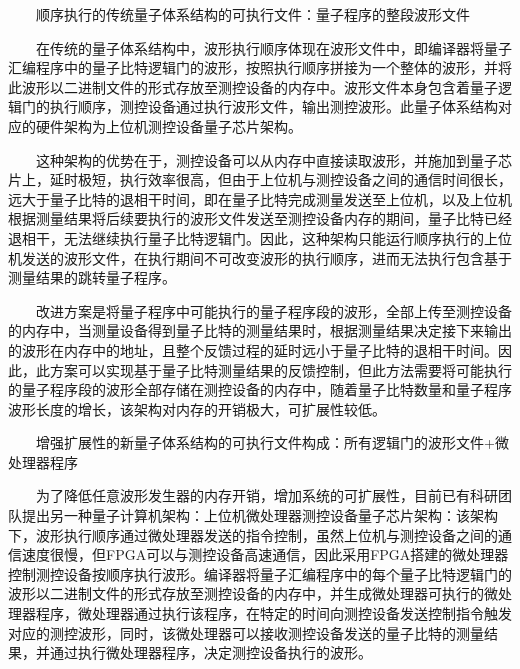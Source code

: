 \documentclass[a4paper,11pt,english]{sphinxmanual}
\begin{document}
\sphinxAtStartPar
{}

\sphinxAtStartPar
  顺序执行的传统量子体系结构的可执行文件：量子程序的整段波形文件

\sphinxAtStartPar
  在传统的量子体系结构中，波形执行顺序体现在波形文件中，即编译器将量子汇编程序中的量子比特逻辑门的波形，按照执行顺序拼接为一个整体的波形，并将此波形以二进制文件的形式存放至测控设备的内存中。波形文件本身包含着量子逻辑门的执行顺序，测控设备通过执行波形文件，输出测控波形。此量子体系结构对应的硬件架构为上位机\sphinxhyphen{}测控设备\sphinxhyphen{}量子芯片架构。

\sphinxAtStartPar
{}

\sphinxAtStartPar
  这种架构的优势在于，测控设备可以从内存中直接读取波形，并施加到量子芯片上，延时极短，执行效率很高，但由于上位机与测控设备之间的通信时间很长，远大于量子比特的退相干时间，即在量子比特完成测量发送至上位机，以及上位机根据测量结果将后续要执行的波形文件发送至测控设备内存的期间，量子比特已经退相干，无法继续执行量子比特逻辑门。因此，这种架构只能运行顺序执行的上位机发送的波形文件，在执行期间不可改变波形的执行顺序，进而无法执行包含基于测量结果的跳转量子程序。

\sphinxAtStartPar
{}

\sphinxAtStartPar
  改进方案是将量子程序中可能执行的量子程序段的波形，全部上传至测控设备的内存中，当测量设备得到量子比特的测量结果时，根据测量结果决定接下来输出的波形在内存中的地址，且整个反馈过程的延时远小于量子比特的退相干时间。因此，此方案可以实现基于量子比特测量结果的反馈控制，但此方法需要将可能执行的量子程序段的波形全部存储在测控设备的内存中，随着量子比特数量和量子程序波形长度的增长，该架构对内存的开销极大，可扩展性较低。

\sphinxAtStartPar
{}

\sphinxAtStartPar
  增强扩展性的新量子体系结构的可执行文件构成：所有逻辑门的波形文件+微处理器程序

\sphinxAtStartPar
  为了降低任意波形发生器的内存开销，增加系统的可扩展性，目前已有科研团队提出另一种量子计算机架构：上位机\sphinxhyphen{}微处理器\sphinxhyphen{}测控设备\sphinxhyphen{}量子芯片架构：该架构下，波形执行顺序通过微处理器发送的指令控制，虽然上位机与测控设备之间的通信速度很慢，但FPGA可以与测控设备高速通信，因此采用FPGA搭建的微处理器控制测控设备按顺序执行波形。编译器将量子汇编程序中的每个量子比特逻辑门的波形以二进制文件的形式存放至测控设备的内存中，并生成微处理器可执行的微处理器程序，微处理器通过执行该程序，在特定的时间向测控设备发送控制指令触发对应的测控波形，同时，该微处理器可以接收测控设备发送的量子比特的测量结果，并通过执行微处理器程序，决定测控设备执行的波形。
\end{document}
